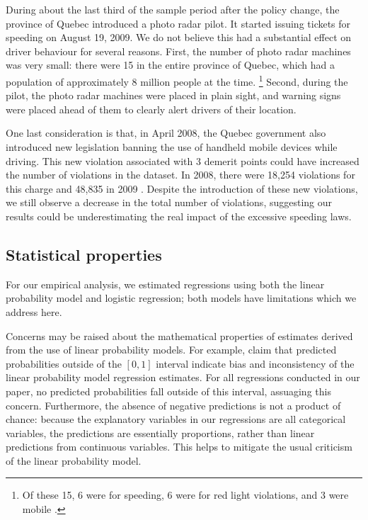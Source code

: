 During about the last third of the sample period after the policy change, 
the province of Quebec introduced a photo radar pilot. 
It started issuing tickets for speeding on August 19, 2009. 
We do not believe this had a substantial effect on driver behaviour for several reasons. 
First, the number of photo radar machines was very small: 
there were 15 in the entire province of Quebec, 
which had a population of approximately 8 million people at the time.%
\footnote{%
Of these 15, 6 were for speeding, 6 were for red light violations, and 3 were mobile 
\citep{bisson2020}.
}  
%
Second, during the pilot, 
the photo radar machines were placed in plain sight, 
and warning signs were placed ahead of them to clearly alert drivers of their location.

One last consideration is that, in April 2008, 
the Quebec government also introduced new legislation 
banning the use of handheld mobile devices while driving. 
This new violation associated with 3 demerit points could have 
increased the number of violations in the dataset. 
In 2008, there were 18,254 violations for this charge and 48,835 in 2009 
% 
\citep[table 1.3]{SAAQ2010}.
%  
Despite the introduction of these new violations, 
we still observe a decrease in the total number of violations, 
suggesting our results could be underestimating the real impact of the excessive speeding laws.



\subsection{Statistical properties}

For our empirical analysis, we estimated regressions using
both the linear probability model
and logistic regression; both models have limitations
which we address here. 

Concerns may be raised about the mathematical properties of estimates 
derived from the use of linear probability models. 
For example, 
\citet{horraceoaxaca2006}
claim that predicted probabilities outside of the $[0,1]$ interval 
indicate bias and inconsistency of the linear probability model regression estimates. 
For all regressions conducted in our paper, 
no predicted probabilities fall outside of this interval, 
assuaging this concern. 
Furthermore, the absence of negative predictions is not a product of chance: 
because the explanatory variables in our regressions are all categorical variables, 
the predictions are essentially proportions, 
rather than linear predictions from continuous variables. 
This helps to mitigate the usual criticism of the linear probability model. 

